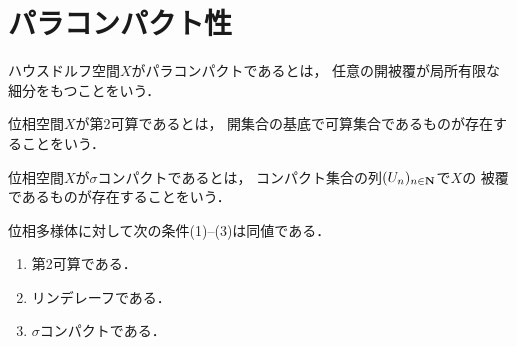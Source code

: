 \section{パラコンパクト性}

\begin{DFN}[パラコンパクト]
    ハウスドルフ空間\(X\)がパラコンパクトであるとは，
    任意の開被覆が局所有限な細分をもつことをいう．
\end{DFN}

\begin{DFN}[第2可算]
    位相空間\(X\)が第2可算であるとは，
    開集合の基底で可算集合であるものが存在することをいう．
\end{DFN}

\begin{DFN}
    位相空間\(X\)が\(\sigma\)コンパクトであるとは，
    コンパクト集合の列\((U_n)_{n\in\mathbf{N}}\)で\(X\)の
    被覆であるものが存在することをいう．
\end{DFN}

\begin{PRP}
    位相多様体に対して次の条件(1)--(3)は同値である．
    \begin{enumerate}[(1)]
        \item 第2可算である．
        \item リンデレーフである．
        \item \(\sigma\)コンパクトである．
    \end{enumerate}
\end{PRP}




























